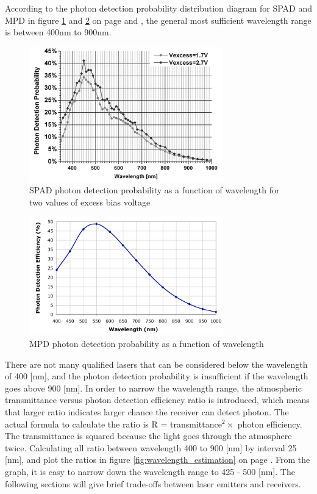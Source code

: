 According to the photon detection probability distribution diagram for \acs{SPAD} and \acs{MPD} in figure \ref{fig:SPAD_efficiency} and \ref{fig:MPD_efficiency} on page \pageref{fig:SPAD_efficiency} and \pageref{fig:MPD_efficiency}, the general most sufficient wavelength range is between 400nm to 900nm. 

\begin{figure}[ht!]
\centering
\includegraphics[width=0.75\textwidth]{chapters/img/SPAD_efficiency.png}
\caption{\acs{SPAD} photon detection probability as a function of wavelength for two values of excess bias voltage}
\label{fig:SPAD_efficiency}
\end{figure}

\begin{figure}[ht!]
\centering
\includegraphics[width=0.75\textwidth]{chapters/img/MPD_efficiency.png}
\caption{\acs{MPD} photon detection probability as a function of wavelength}
\label{fig:MPD_efficiency}
\end{figure}

There are not many qualified \acs{laser}s that can be considered below the wavelength of 400 [nm], and the photon detection probability is insufficient if the wavelength goes above 900 [nm]. In order to narrow the wavelength range, the atmospheric transmittance versus photon detection efficiency ratio is introduced, which means that larger ratio indicates larger chance the receiver can detect photon. The actual formula to calculate the ratio is R = transmittance$^{2} \times$ photon efficiency. The transmittance is squared because the light goes through the atmosphere twice. Calculating all ratio between wavelength 400 to 900 [nm] by interval 25 [nm], and plot the ratios in figure \ref{fig:wavelength_estimation} on page \pageref{fig:wavelength_estimation}. From the graph, it is easy to narrow down the wavelength range to 425 - 500 [nm].  The following sections will give brief trade-offs between \acs{laser} emitters and receivers.

